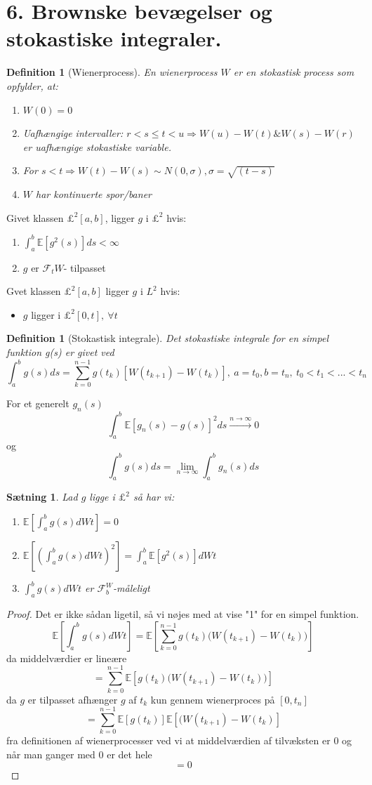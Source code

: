 \documentclass[12pt]{report}
\newtheorem{theorem}[lemma]{Sætning}
\newtheorem{definition}[lemma]{Definition}
\theoremstyle{break}
\newtheorem*{proof}{Bevis}
\theoremstyle{break}
\newcommand{\EE}{\mathbb{E}}
\newcommand{\FI}{\mathcal{F}}
\newcommand{\1}{\mathds{1}}
\begin{document}
\section*{6. Brownske bevægelser og stokastiske integraler.}
\begin{definition}[Wienerprocess]
	En wienerprocess $W$ er en stokastisk process som opfylder, at:
	\begin{enumerate}
		\item $W(0)=0$
		\item Uafhængige intervaller: $r<s\leq t < u\Rightarrow W(u)-W(t) \& W(s)-W(r)$ er uafhængige stokastiske variable.
		\item For $s<t \Rightarrow W(t)-W(s)\sim N(0,\sigma), \sigma=\sqrt{(t-s)}$
		\item $W$ har kontinuerte spor/baner
	\end{enumerate}
\end{definition}
Givet klassen $\pounds^2[a,b]$, ligger $g$ i $\pounds^2$ hvis:
\begin{enumerate}
	\item $\int_{a}^{b}\EE\left[g^2(s)\right]ds<\infty$
	\item $g$ er $\FI_tW$- tilpasset
\end{enumerate}
Gvet klassen $\pounds^2[a,b]$ ligger $g$ i $L^2$ hvis:
\begin{itemize}
	\item $g$ ligger i  $\pounds^2[0,t],~ \forall t$
\end{itemize}
\begin{definition}[Stokastisk integrale]
	Det stokastiske integrale for en simpel funktion g(s) er givet ved
	\[ \int_a^b g(s) ds =\sum\limits_{k=0}^{n-1}g(t_k)[W(t_{k+1})-W(t_k)],~a=t_0,b=t_n,~t_0<t_1<...<t_n \]
\end{definition}
For et generelt $g_n(s)$ \[ \int_{a}^{b}\EE\left[ g_n(s)-g(s) \right]^2ds \xrightarrow{n\to\infty} 0 \] og \[ \int_{a}^{b} g(s) ds= \lim\limits_{n\to \infty}\int_{a}^{b} g_n(s) ds\]
\begin{theorem}
	Lad $g$ ligge i $\pounds^2$ så har vi:
	\begin{enumerate}
		\item $\EE\left[\int_{a}^{b} g(s) dWt  \right]=0$
		\item $\EE\left[\left(\int_{a}^{b} g(s) dWt\right)^2  \right]=\int_{a}^{b}\EE\left[g^2(s)   \right]dWt$
		\item $\int_{a}^{b} g(s) dWt  $ er $\FI_b^W$-måleligt
	\end{enumerate}
\end{theorem}
\begin{proof}
	Det er ikke sådan ligetil, så vi nøjes med at vise "1" for en simpel funktion.
	\[ \EE\left[\int_{a}^{b} g(s) dWt  \right]=\EE\left[ \sum\limits_{k=0}^{n-1}g(t_k)\Big(W(t_{k+1})-W(t_k)\Big)\right] \]
	da middelværdier er lineære
	\[ =\sum\limits_{k=0}^{n-1}\EE\left[ g(t_k)\Big(W(t_{k+1})-W(t_k)\Big)\right] \]
	da $g$ er tilpasset afhænger $g$ af $t_k$ kun gennem wienerproces på $[0,t_n]$
	\[ =\sum\limits_{k=0}^{n-1}\EE\left[ g(t_k)\right] \EE\left[(W(t_{k+1})-W(t_k)\right]\]
	fra definitionen af wienerprocesser ved vi at middelværdien af tilvæksten er $0$ og når man ganger med $0$ er det hele
	\[=0\]
\end{proof}
\newpage
\end{document}
